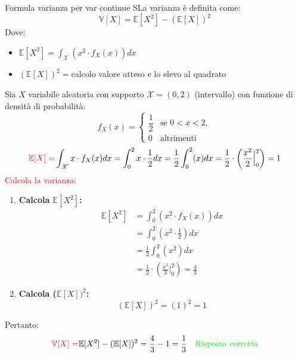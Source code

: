\documentclass{article}  %
\theoremstyle{definition}
\begin{document}
\begin{theorem}{Formula varianza per var continue}
	SLa varianza è definita come:
	\[
		\mathbb{V}[X]=\mathbb{E}[X^2]-(\mathbb{E}[X])^2
	\]
	Dove:
	\begin{itemize}
		\item $\mathbb{E}[X^2]=\int_{\mathscr{X}}(x^2 \cdot f_X(x))dx$
		\item $(\mathbb{E}[X])^2=$calcolo valore atteso e lo elevo al quadrato
	\end{itemize}
	\begin{esercizio}[Esercizio]
		Sia $X$ variabile aleatoria con supporto $\mathscr{X}=(0,2)$ (intervallo) con funzione di densità di probabilità:
		\[
			f_X(x) =
			\begin{cases}
				\dfrac{1}{2} & \text{se } 0 < x < 2, \\[2mm]
				0            & \text{altrimenti}
			\end{cases}
		\]
		\[
			\textcolor{red}{\mathbb{E}[X]=}\int_{\mathscr{X}}x \cdot f_X(x)dx=\int_{0}^{2}x \cdot \frac{1}{2}dx=\frac{1}{2}\int_{0}^{2}(x)dx=\frac{1}{2}\cdot\left( \frac{x^2}{2}\Big|_{0}^{2} \right)=1
		\]
		\textcolor{red}{Calcola la varianza:}
		\begin{enumerate}
			\item \textbf{Calcola $\mathbb{E}[X^2]$:}
			      \begin{align*}
				      \mathbb{E}[X^2]
				       & = \int_{0}^{2} (x^2 \cdot f_X(x))dx                                     \\
				       & = \int_{0}^{2} (x^2 \cdot \frac{1}{2})dx                                \\
				       & =  \frac{1}{2}\int_{0}^{2}(x^2)dx                                       \\
				       & = \frac{1}{2}\cdot\left( \frac{x^3}{3}\Big|_{0}^{2} \right)=\frac{4}{3}
			      \end{align*}
			\item \textbf{Calcola ($\mathbb{E}[X])^2$:}
			      \[
				      (\mathbb{E}[X])^2=(1)^2=1
			      \]
		\end{enumerate}
		Pertanto:
		\[
			\textcolor{red}{\mathbb{V}[X]=} \mathbb{E}[X^2]-(\mathbb{E}[X])^2=\frac{4}{3}-1=\frac{1}{3} \quad \textcolor{green}{\text{Risposta corretta}}
		\]
	\end{esercizio}
\end{theorem}
\end{document}
